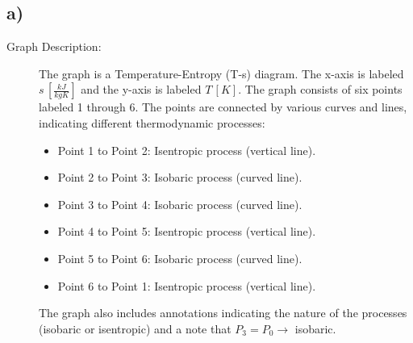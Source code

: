 

\subsection*{a)}

\begin{description}
    \item[Graph Description:] The graph is a Temperature-Entropy (T-s) diagram. The x-axis is labeled $s \, [\frac{kJ}{kgK}]$ and the y-axis is labeled $T \, [K]$. The graph consists of six points labeled 1 through 6. The points are connected by various curves and lines, indicating different thermodynamic processes:
    \begin{itemize}
        \item Point 1 to Point 2: Isentropic process (vertical line).
        \item Point 2 to Point 3: Isobaric process (curved line).
        \item Point 3 to Point 4: Isobaric process (curved line).
        \item Point 4 to Point 5: Isentropic process (vertical line).
        \item Point 5 to Point 6: Isobaric process (curved line).
        \item Point 6 to Point 1: Isentropic process (vertical line).
    \end{itemize}
    The graph also includes annotations indicating the nature of the processes (isobaric or isentropic) and a note that $P_3 = P_0 \rightarrow$ isobaric.
\end{description}
